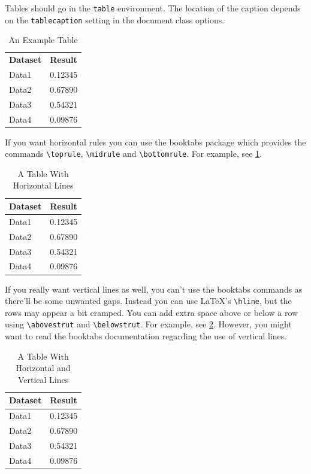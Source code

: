 \documentclass[ml4h-mathphys]{ml4h-jnl}%
\theoremstyle{thmstyleone}%
\theoremstyle{thmstyletwo}%
\theoremstyle{thmstylethree}%
\begin{document}
Tables should go in the \texttt{table} environment. 
The location of the caption depends on the \verb|tablecaption|
setting in the document class options.

\begin{table}[htbp]
  {\caption{An Example Table}}%
  {\begin{tabular}{ll}
  \bfseries Dataset & \bfseries Result\\
  Data1 & 0.12345\\
  Data2 & 0.67890\\
  Data3 & 0.54321\\
  Data4 & 0.09876
  \end{tabular}}
\end{table}

If you want horizontal rules you can use the \textsf{booktabs}
package which provides the commands \verb|\toprule|, 
\verb|\midrule| and \verb|\bottomrule|. For example, see
\ref{table:example-booktabs}.

\begin{table}[hbtp]
  \label{table:example-booktabs}
  {\caption{A Table With Horizontal Lines}}
  {\begin{tabular}{ll}
  \toprule
  \bfseries Dataset & \bfseries Result\\
  \midrule
  Data1 & 0.12345\\
  Data2 & 0.67890\\
  Data3 & 0.54321\\
  Data4 & 0.09876\\
  \bottomrule
  \end{tabular}}
\end{table}

If you really want vertical lines as well, you can't use the
\textsf{booktabs} commands as there'll be some unwanted gaps.
Instead you can use \LaTeX's \verb|\hline|, but the rows may
appear a bit cramped.  You can add extra space above or below a
row using \verb|\abovestrut| and \verb|\belowstrut|. For example,
see \ref{table:example-hline}. However, you might want to read
the \textsf{booktabs} documentation regarding the use of vertical
lines.

\begin{table}[htbp]
  \label{table:example-hline}
  {\caption{A Table With Horizontal and Vertical Lines}}%
  {%
    \begin{tabular}{|l|l|}
    \hline
    \bfseries Dataset & \bfseries Result\\\hline
    Data1 & 0.12345\\
    Data2 & 0.67890\\
    Data3 & 0.54321\\
    Data4 & 0.09876\\\hline
    \end{tabular}
  }
\end{table}
\end{document}
